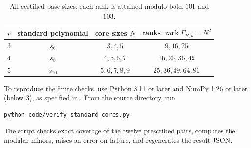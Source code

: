 \documentclass[11pt,reqno]{amsart}
\theoremstyle{plain}
\theoremstyle{definition}
\numberwithin{equation}{section}
\begin{document}
\begin{table}[htbp]
\centering
\caption{All certified base sizes; each rank is attained modulo both $101$ and $103$.}\label{tab:cores}
\begin{tabular}{@{}c c c c@{}}\toprule
$r$ & standard polynomial & core sizes $N$ & ranks $\operatorname{rank}\Gamma_{B,u}=N^2$\\\midrule
$3$ & $s_6$ & $3,4,5$ & $9,16,25$\\
$4$ & $s_8$ & $4,5,6,7$ & $16,25,36,49$\\
$5$ & $s_{10}$ & $5,6,7,8,9$ & $25,36,49,64,81$\\\bottomrule
\end{tabular}
\end{table}

To reproduce the finite checks, use Python 3.11 or later and NumPy 1.26 or later (below 3), as specified in . From the source directory, run
\begin{center}
\texttt{python code/verify\_standard\_cores.py}
\end{center}
The script checks exact coverage of the twelve prescribed pairs, computes the modular minors, raises an error on failure, and regenerates the result JSON.



\end{document}
